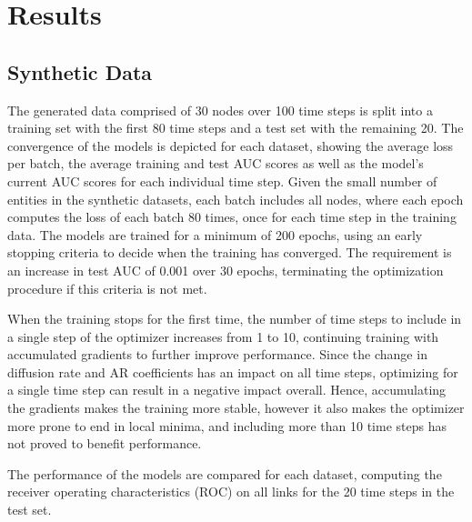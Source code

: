 \chapter{Results}\label{ch:Results}

\section{Synthetic Data}

The generated data comprised of 30 nodes over 100 time steps is split into a training set with the first 80 time steps and a test set with the remaining 20. The convergence of the models is depicted for each dataset, showing the average loss per batch, the average training and test AUC scores as well as the model's current AUC scores for each individual time step. Given the small number of entities in the synthetic datasets, each batch includes all nodes, where each epoch computes the loss of each batch 80 times, once for each time step in the training data. The models are trained for a minimum of 200 epochs, using an early stopping criteria to decide when the training has converged. The requirement is an increase in test AUC of 0.001 over 30 epochs, terminating the optimization procedure if this criteria is not met. 

When the training stops for the first time, the number of time steps to include in a single step of the optimizer increases from 1 to 10, continuing training with accumulated gradients to further improve performance. Since the change in diffusion rate and AR coefficients has an impact on all time steps, optimizing for a single time step can result in a negative impact overall. Hence, accumulating the gradients makes the training more stable, however it also makes the optimizer more prone to end in local minima, and including more than 10 time steps has not proved to benefit performance.

The performance of the models are compared for each dataset, computing the receiver operating characteristics (ROC) on all links for the 20 time steps in the test set.


    
